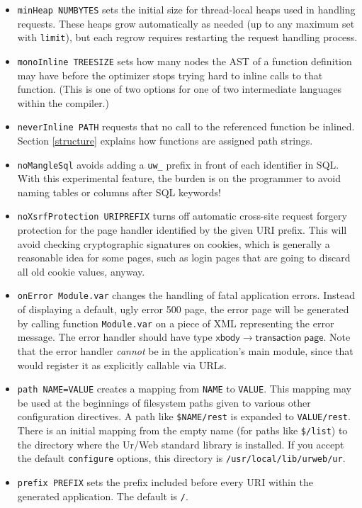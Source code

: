 \documentclass{article}
\newcommand{\mt}[1]{\mathsf{#1}}
\begin{document}
\begin{itemize}
\item \texttt{minHeap NUMBYTES} sets the initial size for thread-local heaps used in handling requests.  These heaps grow automatically as needed (up to any maximum set with \texttt{limit}), but each regrow requires restarting the request handling process.
\item \texttt{monoInline TREESIZE} sets how many nodes the AST of a function definition may have before the optimizer stops trying hard to inline calls to that function.  (This is one of two options for one of two intermediate languages within the compiler.)
\item \texttt{neverInline PATH} requests that no call to the referenced function be inlined.  Section \ref{structure} explains how functions are assigned path strings.
\item \texttt{noMangleSql} avoids adding a \texttt{uw\_} prefix in front of each identifier in SQL.  With this experimental feature, the burden is on the programmer to avoid naming tables or columns after SQL keywords!
\item \texttt{noXsrfProtection URIPREFIX} turns off automatic cross-site request forgery protection for the page handler identified by the given URI prefix.  This will avoid checking cryptographic signatures on cookies, which is generally a reasonable idea for some pages, such as login pages that are going to discard all old cookie values, anyway.
\item \texttt{onError Module.var} changes the handling of fatal application errors.  Instead of displaying a default, ugly error 500 page, the error page will be generated by calling function \texttt{Module.var} on a piece of XML representing the error message.  The error handler should have type $\mt{xbody} \to \mt{transaction} \; \mt{page}$.  Note that the error handler \emph{cannot} be in the application's main module, since that would register it as explicitly callable via URLs.
\item \texttt{path NAME=VALUE} creates a mapping from \texttt{NAME} to \texttt{VALUE}.  This mapping may be used at the beginnings of filesystem paths given to various other configuration directives.  A path like \texttt{\$NAME/rest} is expanded to \texttt{VALUE/rest}.  There is an initial mapping from the empty name (for paths like \texttt{\$/list}) to the directory where the Ur/Web standard library is installed.  If you accept the default \texttt{configure} options, this directory is \texttt{/usr/local/lib/urweb/ur}.
\item \texttt{prefix PREFIX} sets the prefix included before every URI within the generated application.  The default is \texttt{/}.

\end{itemize}
\end{document}
